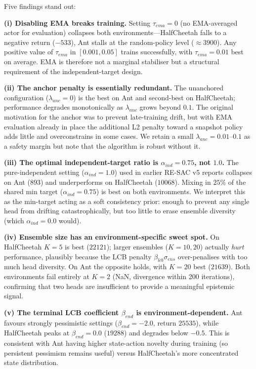 \documentclass[10pt]{article}
\begin{document}
Five findings stand out:

\textbf{(i) Disabling EMA breaks training.} Setting $\tau_{ema}{=}0$ (no EMA-averaged actor for evaluation) collapses both environments---HalfCheetah falls to a negative return ($-533$), Ant stalls at the random-policy level ($\approx 3900$). Any positive value of $\tau_{ema}$ in $[0.001, 0.05]$ trains successfully, with $\tau_{ema}{=}0.01$ best on average. EMA is therefore not a marginal stabiliser but a structural requirement of the independent-target design.

\textbf{(ii) The anchor penalty is essentially redundant.} The unanchored configuration ($\lambda_{anc}{=}0$) is the best on Ant and second-best on HalfCheetah; performance degrades monotonically as $\lambda_{anc}$ grows beyond $0.1$. The original motivation for the anchor was to prevent late-training drift, but with EMA evaluation already in place the additional L2 penalty toward a snapshot policy adds little and overconstrains in some cases. We retain a small $\lambda_{anc}{=}0.01$--$0.1$ as a safety margin but note that the algorithm is robust without it.

\textbf{(iii) The optimal independent-target ratio is $\alpha_{ind}{=}0.75$, not $1.0$.} The pure-independent setting ($\alpha_{ind}{=}1.0$) used in earlier RE-SAC v5 reports collapses on Ant ($893$) and underperforms on HalfCheetah ($10068$). Mixing in $25\%$ of the shared min target ($\alpha_{ind}{=}0.75$) is best on both environments. We interpret this as the min-target acting as a soft consistency prior: enough to prevent any single head from drifting catastrophically, but too little to erase ensemble diversity (which $\alpha_{ind}{=}0.0$ would).

\textbf{(iv) Ensemble size has an environment-specific sweet spot.} On HalfCheetah $K{=}5$ is best ($22121$); larger ensembles ($K{=}10, 20$) actually \emph{hurt} performance, plausibly because the LCB penalty $\beta_{lcb}\sigma_{ens}$ over-penalises with too much head diversity. On Ant the opposite holds, with $K{=}20$ best ($21639$). Both environments fail entirely at $K{=}2$ (NaN, divergence within 200 iterations), confirming that two heads are insufficient to provide a meaningful epistemic signal.

\textbf{(v) The terminal LCB coefficient $\beta_{end}$ is environment-dependent.} Ant favours strongly pessimistic settings ($\beta_{end}{=}{-2.0}$, return $25535$), while HalfCheetah peaks at $\beta_{end}{=}0.0$ ($19288$) and degrades below $-0.5$. This is consistent with Ant having higher state-action novelty during training (so persistent pessimism remains useful) versus HalfCheetah's more concentrated state distribution.
\end{document}
